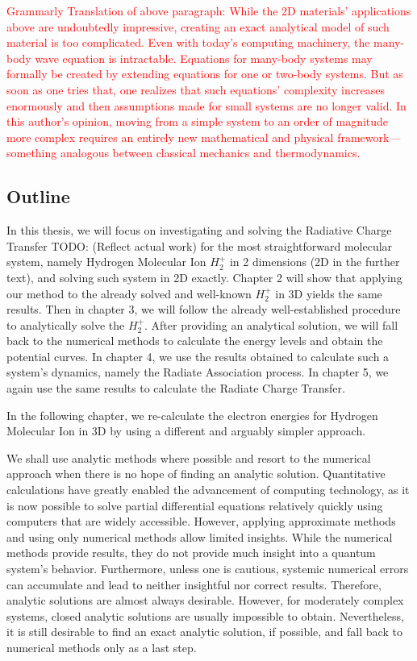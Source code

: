 \textcolor{red}{Grammarly Translation of above paragraph: 
While the 2D materials' applications above are undoubtedly impressive, creating an exact analytical model of such material is too complicated. Even with today's computing machinery, the many-body wave equation is intractable.  Equations for many-body systems may formally be created by extending equations for one or two-body systems. But as soon as one tries that, one realizes that such equations' complexity increases enormously and then assumptions made for small systems are no longer valid. In this author's opinion, moving from a simple system to an order of magnitude more complex requires an entirely new mathematical and physical framework—something analogous between classical mechanics and thermodynamics.} 

\subsection*{Outline}
In this thesis, we will focus on investigating and solving the Radiative Charge Transfer TODO: (Reflect actual work) for the most straightforward molecular system, namely Hydrogen Molecular Ion $ {H_2^{+}}  $ in 2 dimensions (2D in the further text), and solving such system in 2D exactly.  Chapter 2 will show that applying our method to the already solved and well-known $ {H_2^{+}} $ in 3D yields the same results. Then in chapter 3, we will follow the already well-established procedure \cite{Bates1} to analytically solve the $ {H_2^{+}} $. After providing an analytical solution, we will fall back to the numerical methods to calculate the energy levels and obtain the potential curves. In chapter 4, we use the results obtained to calculate such a system's dynamics, namely the Radiate Association process. In chapter 5, we again use the same results to calculate the Radiate Charge Transfer. 

In the following chapter, we re-calculate the electron energies for Hydrogen Molecular Ion in 3D by using a different and arguably simpler approach.

We shall use analytic methods where possible and resort to the numerical approach when there is no hope of finding an analytic solution.
Quantitative calculations have greatly enabled the advancement of computing technology, as it is now possible to solve partial differential equations relatively quickly using computers that are widely accessible.  However, applying approximate methods and using only numerical methods allow limited insights. While the numerical methods provide results, they do not provide much insight into a quantum system's behavior. Furthermore, unless one is cautious, systemic numerical errors can accumulate and lead to neither insightful nor correct results. Therefore, analytic solutions are almost always desirable. However, for moderately complex systems, closed analytic solutions are usually impossible to obtain. Nevertheless, it is still desirable to find an exact analytic solution,  if possible, and fall back to numerical methods only as a last step. 